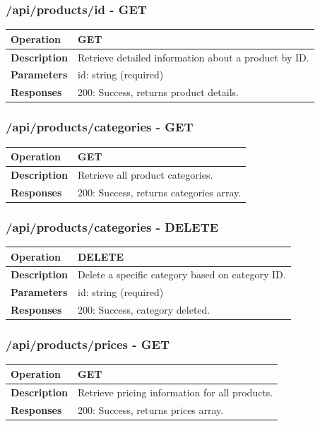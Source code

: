 \subsubsection*{/api/products/{id} - GET}
\begin{tabular}{|>{\raggedright\arraybackslash}p{3cm}|p{12cm}|}
\hline
\textbf{Operation} & GET \\
\hline
\textbf{Description} & Retrieve detailed information about a product by ID. \\
\hline
\textbf{Parameters} & id: string (required) \\
\hline
\textbf{Responses} & 200: Success, returns product details. \\
\hline
\end{tabular}

\subsubsection*{/api/products/categories - GET}
\begin{tabular}{|>{\raggedright\arraybackslash}p{3cm}|p{12cm}|}
\hline
\textbf{Operation} & GET \\
\hline
\textbf{Description} & Retrieve all product categories. \\
\hline
\textbf{Responses} & 200: Success, returns categories array. \\
\hline
\end{tabular}

\subsubsection*{/api/products/categories - DELETE}
\begin{tabular}{|>{\raggedright\arraybackslash}p{3cm}|p{12cm}|}
\hline
\textbf{Operation} & DELETE \\
\hline
\textbf{Description} & Delete a specific category based on category ID. \\
\hline
\textbf{Parameters} & id: string (required) \\
\hline
\textbf{Responses} & 200: Success, category deleted. \\
\hline
\end{tabular}

\subsubsection*{/api/products/prices - GET}
\begin{tabular}{|>{\raggedright\arraybackslash}p{3cm}|p{12cm}|}
\hline
\textbf{Operation} & GET \\
\hline
\textbf{Description} & Retrieve pricing information for all products. \\
\hline
\textbf{Responses} & 200: Success, returns prices array. \\
\hline
\end{tabular}

